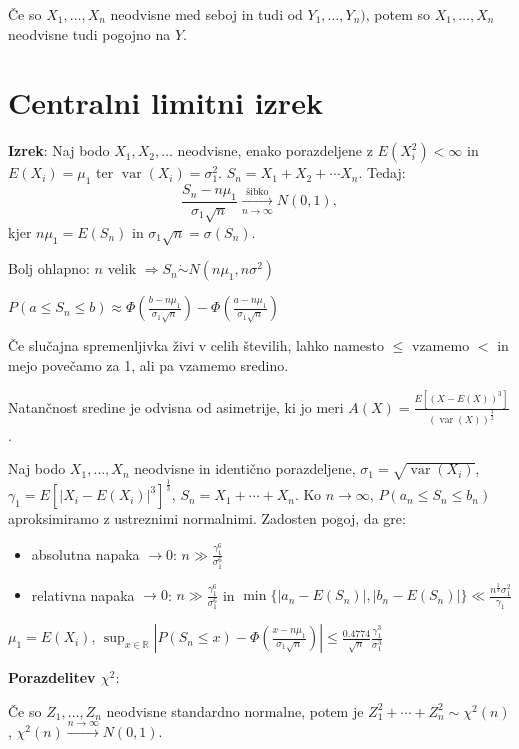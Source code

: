 \documentclass[11pt,a4paper]{amsart}
\theoremstyle{definition} %
\theoremstyle{plain} %
\newcommand{\R}{\mathbb R}
\DeclareMathOperator{\var}{var}
\begin{document}
Če so $X_1,\ldots , X_n$ neodvisne med seboj in tudi od $Y_1,\ldots , Y_n)$,
potem so $X_1,\ldots, X_n$ neodvisne tudi pogojno na $Y$.

\section*{Centralni limitni izrek}

\textbf{Izrek}: Naj bodo $X_1,X_2, \ldots$ neodvisne, enako porazdeljene z
$E(X_i^2) < \infty$ in $E(X_i) = \mu_1$ ter $\var(X_i) = \sigma_1^2$. $S_n = X_1
+ X_2 + \cdots X_n$. Tedaj:
$$
\frac{S_n - n\mu_1}{\sigma_1 \sqrt{n} } \xrightarrow[n\rightarrow \infty]{\text{šibko}} N(0,1),
$$
kjer $n\mu_1 = E(S_n)$ in $\sigma_1 \sqrt{n} = \sigma(S_n)$.

Bolj ohlapno: $n$ velik $\Longrightarrow S_n \dot{\sim} N(n\mu_1, n\sigma^2)$

$P(a \leq S_n \leq b) \approx \Phi(\frac{b-n\mu_1}{\sigma_1\sqrt{n}}) - \Phi
(\frac{a-n\mu_1}{\sigma_1 \sqrt{n}})$

Če slučajna spremenljivka živi v celih številih, lahko namesto $\leq$ vzamemo
$<$ in mejo povečamo za 1, ali pa vzamemo sredino.

Natančnost sredine je odvisna od asimetrije, ki jo meri $A(X) =
\frac{E[(X-E(X))^3]}{(\var(X))^{ \frac{3}{2}}}$.

Naj bodo $X_1,\ldots, X_n$ neodvisne in identično porazdeljene, $\sigma_1 =
\sqrt{\var(X_i)}$, $\gamma_1 = E[|X_i - E(X_i) |^3]^{\frac{1}{3}}$, $S_n = X_1
+ \cdots + X_n$. Ko $n \longrightarrow \infty$, $P(a_n \leq S_n \leq b_n)$
aproksimiramo z ustreznimi normalnimi. Zadosten pogoj, da gre:

\begin{itemize}
\item absolutna napaka $\rightarrow 0$: $n \gg \frac{\gamma_1^6}{\sigma_1^6}$
\item relativna napaka $\rightarrow 0$: $n \gg \frac{\gamma_1^6}{\sigma_1^6}$ in $\min \{ |a_n - E(S_n)|, |b_n - E(S_n)| \} \ll \frac{n^{\frac{2}{3}}\sigma_1^2}{\gamma_1}$
\end{itemize}

$\mu_1 = E(X_i)$, $\sup_{x\in \R} |P(S_n \leq x) - \Phi(
\frac{x-n\mu_1}{\sigma_1 \sqrt{n}} )| \leq \frac{0.4774}{\sqrt{n}}
\frac{\gamma_1^3}{\sigma_1^3}$

\textbf{Porazdelitev $\chi^2$}:

Če so $Z_1,\ldots ,Z_n$ neodvisne standardno normalne, potem je $Z_1^2 + \cdots
+ Z_n^2 \sim \chi^2(n)$, $\chi^2 (n) \xrightarrow{n\rightarrow \infty} N(0,1)$.
\end{document}
